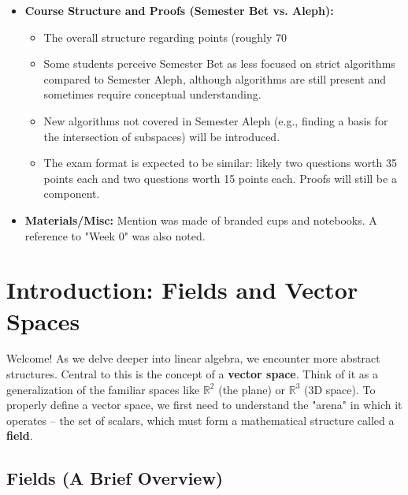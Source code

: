 \documentclass[11pt]{article}
\theoremstyle{definition}
\theoremstyle{remark}
\newcommand{\field}[1]{\mathbb{#1}} %
\newcommand{\R}{\field{R}}
\begin{document}
\begin{itemize}
    \item \textbf{Course Structure and Proofs (Semester Bet vs. Aleph):}
        \begin{itemize}
            \item The overall structure regarding points (roughly 70%
            \item Some students perceive Semester Bet as less focused on strict algorithms compared to Semester Aleph, although algorithms are still present and sometimes require conceptual understanding.
            \item New algorithms not covered in Semester Aleph (e.g., finding a basis for the intersection of subspaces) will be introduced.
            \item The exam format is expected to be similar: likely two questions worth 35 points each and two questions worth 15 points each. Proofs will still be a component.
        \end{itemize}

     \item \textbf{Materials/Misc:} Mention was made of branded cups and notebooks. A reference to "Week 0" was also noted.
\end{itemize}
\vspace{2ex}
\hrulefill
\vspace{2ex}

\section{Introduction: Fields and Vector Spaces}

Welcome! As we delve deeper into linear algebra, we encounter more abstract structures. Central to this is the concept of a \textbf{vector space}. Think of it as a generalization of the familiar spaces like $\R^2$ (the plane) or $\R^3$ (3D space). To properly define a vector space, we first need to understand the "arena" in which it operates – the set of scalars, which must form a mathematical structure called a \textbf{field}.

\subsection{Fields (A Brief Overview)}
\end{document}
